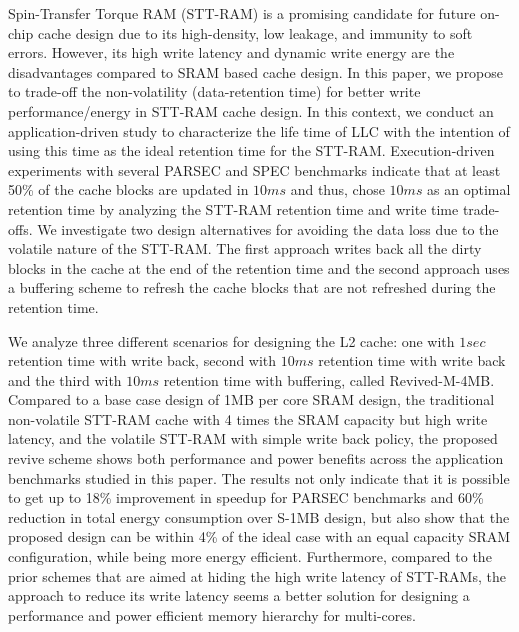 Spin-Transfer Torque RAM (STT-RAM) is a promising candidate for future
on-chip cache design due to its high-density, low leakage, and immunity to
soft errors.  However, its high write latency and dynamic
write energy are the disadvantages compared to SRAM based cache design.
In this paper, we propose to trade-off the non-volatility (data-retention time)
for better write performance/energy in STT-RAM cache design.
In this context, we conduct an application-driven study to characterize the
life time of LLC with the intention of using this time as the ideal
retention time for the STT-RAM. Execution-driven experiments with several PARSEC and SPEC benchmarks
indicate that at least 50\% of the cache blocks are updated in $10ms$ and thus, chose $10ms$
as an optimal retention time by analyzing the STT-RAM retention time and write time trade-offs.
We investigate two design alternatives for avoiding the data loss due to the volatile nature of the
STT-RAM. The first approach writes back all the dirty blocks in the cache at the end of the retention time
and the second approach uses a buffering scheme to refresh the cache blocks that are not refreshed
during the retention time.

We analyze three different scenarios for designing the L2 cache: one with $1sec$ retention time with write back,
second with $10ms$ retention time with write back and the third with $10ms$ retention time with buffering, called
Revived-M-4MB. Compared to a base case design of 1MB per core SRAM design, the traditional non-volatile STT-RAM
cache with 4 times the SRAM capacity but high write latency, and the volatile STT-RAM with simple write back policy,
the proposed revive scheme shows both performance and power benefits across the application benchmarks studied in
this paper. The results not only indicate that it is possible to get up to 18\% improvement in speedup for PARSEC
benchmarks and 60\% reduction in total energy consumption over S-1MB design, but also show that the proposed design can be within 4\% of the ideal case with an equal capacity SRAM configuration, while being more energy efficient.
Furthermore, compared to the prior schemes that are aimed at hiding the high write latency of STT-RAMs,
the approach to reduce its write latency seems a better solution for designing a performance and power efficient
memory hierarchy for multi-cores.

